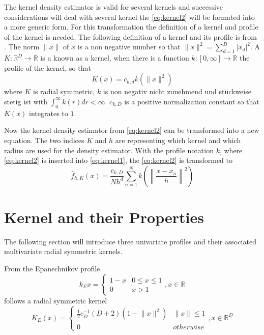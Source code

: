 The kernel density estimator is valid for several kernels and successive
considerations will deal with several kernel the \autoref{eq:kernel2} will be
formated into a more generic form. For this transformation the definition of a
kernel and profile of the kernel is needed. The following definition of a kernel
and its profile is from \citeauthor{citeulike:2522867}
\citep{citeulike:2522867}. The norm $\lVert x \rVert$ of $x$ is a non negative number 
so that $\lVert x \rVert^2 = \sum_{d = 1}^D|x_d|^2$.
A $K:\mathbb{R}^D \rightarrow \mathbb{R}$ is
a known as a kernel, when there is a function $k:[0, \infty] \rightarrow
\mathbb{R}$ the profile of the kernel, so that
\begin{equation}\label{eq:kernel3}
	K(x)=c_{k,d}k(\lVert x \rVert^2)
\end{equation}
where $K$ is radial symmetric, $k$ is non negativ {\color{iRed} nicht zunehmend
und stückweise stetig ist} with $\int_0^{\infty} k(r) dr < \infty$. $c_{k,D}$ is
a positive normalization constant so that $K(x)$ integrates to $1$. 

Now the kernel density estimator from \autoref{eq:kernel2} can be transformed into
a new equation. The two indices $K$ and $h$ are representing which kernel and 
which radius are used for the density estimator. With the profile notation $k$, where
\autoref{eq:kernel2} is inserted into \autoref{eq:kernel1}, the \autoref{eq:kernel2}
is transformed to
\begin{equation}\label{eq:kernel4}
	\hat{f}_{h,K}(x) = \frac{c_{k,D}}{Nh^d}
	\sum_{n = 1}^N k\left(\left\lVert \frac{x-x_n}{h} \right\rVert^2\right)
\end{equation}



\section{Kernel and their Properties} %
\label{sec:kernel_properties}
The following section will introduce three univariate profiles and their associated
multivariate radial symmetric kernels. 

From the Epanechnikov profile
\begin{equation}\label{eq:epa}
	k_E{x} = \begin{cases}
				1 - x &  0 \leq x \leq 1\\
				0 & x > 1
		\end{cases}, x \in \mathbb{R}
\end{equation}
follows a radial symmetric kernel
\begin{equation}\label{eq:epak}
	K_E(x) = \begin{cases}
				\frac{1}{2}c_D^{-1}(D+2)(1-\lVert x \rVert^2) &  \lVert x \rVert \leq 1 \\
				0 & \mathit{otherwise}
		\end{cases}, x \in \mathbb{R}^D
\end{equation}
 
